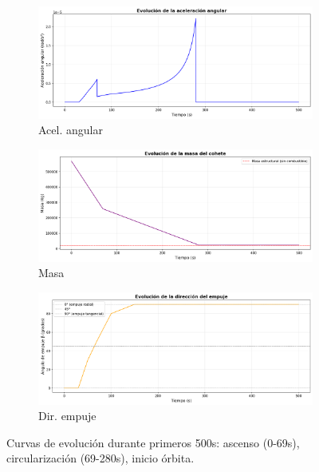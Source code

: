 \documentclass[10pt,a4paper]{article}
\begin{document}
\begin{figure}[H]
\begin{subfigure}{0.32\textwidth}
    \includegraphics[width=\textwidth]{../graficos/05_aceleracion_angular.png}
    \caption{\footnotesize Acel. angular}
\end{subfigure}
\hfill
\begin{subfigure}{0.32\textwidth}
    \includegraphics[width=\textwidth]{../graficos/04_masa_cohete.png}
    \caption{\footnotesize Masa}
\end{subfigure}
\hfill
\begin{subfigure}{0.32\textwidth}
    \includegraphics[width=\textwidth]{../graficos/08_direccion_empuje_beta.png}
    \caption{\footnotesize Dir. empuje}
\end{subfigure}
\caption{\small Curvas de evolución durante primeros 500s: ascenso (0-69s), circularización (69-280s), inicio órbita.}
\label{fig:curvas}
\end{figure}
\end{document}
